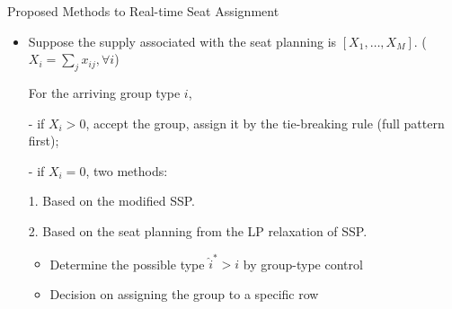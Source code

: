   \begin{frame}{Proposed Methods to Real-time Seat Assignment}

    \begin{itemize}
      \item Suppose the supply associated with the seat planning is $[X_{1}, \ldots, X_M]$. ($X_{i} = \sum_{j} x_{ij}, \forall i$)
      
      \vspace{0.5cm}

      For the arriving group type $i$,

      \item[-] if $X_i > 0$, accept the group, assign it by the tie-breaking rule (full pattern first);
      
      \item[-] if $X_i = 0$, two methods:
      
      \vspace{0.5cm}

      1. Based on the modified SSP.
      \vspace{0.5cm}

      2. Based on the seat planning from the LP relaxation of SSP.
      \begin{itemize}
        \item Determine the possible type $\hat{i}^{*}>i$ by group-type control
        \item Decision on assigning the group to a specific row
      \end{itemize}
    \end{itemize}
  \end{frame}

